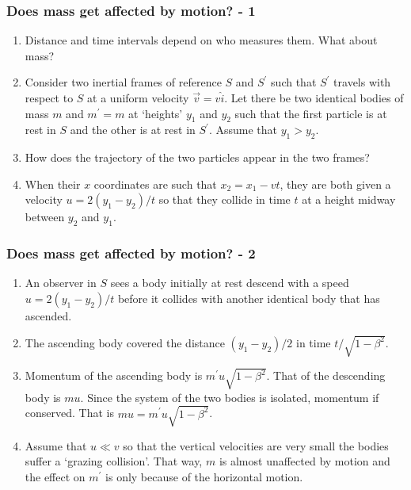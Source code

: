 \documentclass{beamer}
\begin{document}
\begin{frame}
\frametitle{Does mass get affected by motion? - 1}
\begin{enumerate}
\item Distance and time intervals depend on who measures them. What about mass?
\item Consider two inertial frames of reference $S$ and $S^\prime$ such that 
$S^\prime$ travels with respect to $S$ at a uniform velocity $\vec{v}=v\hat{i}$.
Let there be two identical bodies of mass $m$ and $m^\prime = m$ at `heights' 
$y_1$ and $y_2$ such that the first particle is at rest in $S$ and the other 
is at rest in $S^\prime$. Assume that $y_1 > y_2$.
\item How does the trajectory of the two particles appear in the two frames?
\item When their $x$ coordinates are such that $x_2 = x_1 - vt$, they are both 
given a velocity $u = 2(y_1 - y_2)/t$ so that they collide in time $t$ at a
height midway between $y_2$ and $y_1$.
\end{enumerate}
\end{frame}

\begin{frame}
\frametitle{Does mass get affected by motion? - 2}
\begin{enumerate}
\item An observer in $S$ sees a body initially at rest descend with a speed 
$u = 2(y_1 - y_2)/t$ before it collides with another identical body that has
ascended.
\item The ascending body covered the distance $(y_1 - y_2)/2$ in time 
$t/\sqrt{1 - \beta^2}$. 
\item Momentum of the ascending body is $m^\prime u\sqrt{1 - \beta^2}$. That of 
the descending body is $mu$. Since the system of the two bodies is isolated, 
momentum if conserved. That is $mu = m^\prime u\sqrt{1 - \beta^2}$.
\item Assume that $u \ll v$ so that the vertical velocities are very small the
bodies suffer a `grazing collision'. That way, $m$ is almost unaffected by 
motion and the effect on $m^\prime$ is only because of the horizontal motion.
\end{enumerate}
\end{frame}
\end{document}
